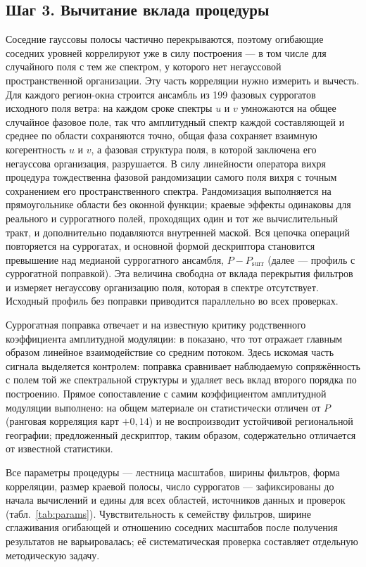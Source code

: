 \documentclass[11pt,a4paper]{article}
\newcommand{\Psurr}{P_{\mathrm{surr}}}
\begin{document}
\subsection{Шаг 3. Вычитание вклада процедуры}

Соседние гауссовы полосы частично перекрываются, поэтому огибающие соседних уровней коррелируют уже в силу построения --- в том числе для случайного поля с тем же спектром, у которого нет негауссовой пространственной организации. Эту часть корреляции нужно измерить и вычесть. Для каждого регион-окна строится ансамбль из 199 фазовых суррогатов исходного поля ветра: на каждом сроке спектры $u$ и $v$ умножаются на общее случайное фазовое поле, так что амплитудный спектр каждой составляющей и среднее по области сохраняются точно, общая фаза сохраняет взаимную когерентность $u$ и $v$, а фазовая структура поля, в которой заключена его негауссова организация, разрушается. В силу линейности оператора вихря процедура тождественна фазовой рандомизации самого поля вихря с точным сохранением его пространственного спектра. Рандомизация выполняется на прямоугольнике области без оконной функции; краевые эффекты одинаковы для реального и суррогатного полей, проходящих один и тот же вычислительный тракт, и дополнительно подавляются внутренней маской. Вся цепочка операций повторяется на суррогатах, и основной формой дескриптора становится превышение над медианой суррогатного ансамбля, $P-\Psurr$ (далее --- профиль с суррогатной поправкой). Эта величина свободна от вклада перекрытия фильтров и измеряет негауссову организацию поля, которая в спектре отсутствует. Исходный профиль без поправки приводится параллельно во всех проверках.

Суррогатная поправка отвечает и на известную критику родственного коэффициента амплитудной модуляции: в \cite{CuiJacobi2025} показано, что тот отражает главным образом линейное взаимодействие со средним потоком. Здесь искомая часть сигнала выделяется контролем: поправка сравнивает наблюдаемую сопряжённость с полем той же спектральной структуры и удаляет весь вклад второго порядка по построению. Прямое сопоставление с самим коэффициентом амплитудной модуляции выполнено: на общем материале он статистически отличен от $P$ (ранговая корреляция карт $+0{,}14$) и не воспроизводит устойчивой региональной географии; предложенный дескриптор, таким образом, содержательно отличается от известной статистики.

Все параметры процедуры --- лестница масштабов, ширины фильтров, форма корреляции, размер краевой полосы, число суррогатов --- зафиксированы до начала вычислений и едины для всех областей, источников данных и проверок (табл.~\ref{tab:params}). Чувствительность к семейству фильтров, ширине сглаживания огибающей и отношению соседних масштабов после получения результатов не варьировалась; её систематическая проверка составляет отдельную методическую задачу.
\end{document}
